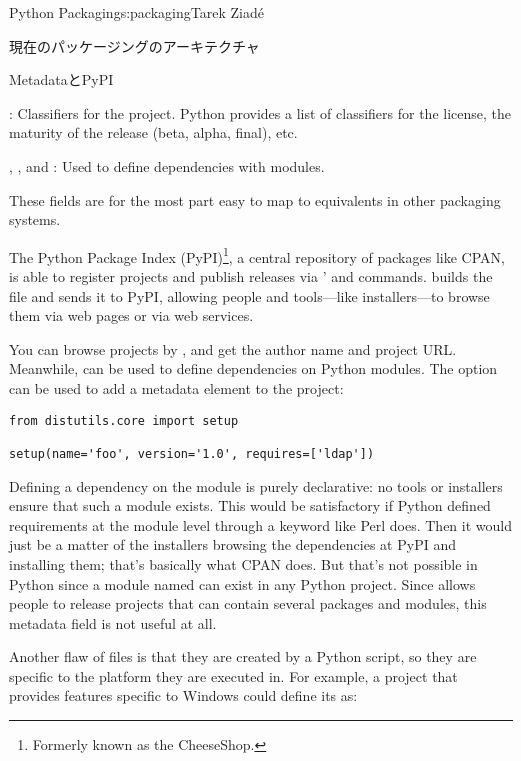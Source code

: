 \begin{aosachapter}{Python Packaging}{s:packaging}{Tarek Ziad\'{e}}
\begin{aosasect1}{現在のパッケージングのアーキテクチャ}
\begin{aosasect2}{MetadataとPyPI}
\begin{aosaitemize}
  \item {}: Classifiers for the project. Python provides a list
  of classifiers for the license, the maturity of the release (beta,
  alpha, final), etc.

  \item {}, , and :
  Used to define dependencies with modules.

\end{aosaitemize}

\noindent
These fields are for the most part easy to map to equivalents in other
packaging systems.

The Python Package Index (PyPI)\footnote{Formerly known as the
CheeseShop.}, a central repository of packages like CPAN, is able to
register projects and publish releases via '
 and  commands.   builds
the  file and sends it to PyPI, allowing people and
tools---like installers---to browse them via web pages or via web
services.


You can browse projects by , and get the author name
and project URL\@.  Meanwhile,  can be used to define
dependencies on Python modules.  The  option can be
used to add a  metadata element to the project:

\begin{verbatim}
from distutils.core import setup

setup(name='foo', version='1.0', requires=['ldap'])
\end{verbatim}

Defining a dependency on the  module is purely declarative:
no tools or installers ensure that such a module exists.  This would be
satisfactory if Python defined requirements at the module level
through a  keyword like Perl does.  Then it would
just be a matter of the installers browsing the dependencies at PyPI
and installing them; that's basically what CPAN does.  But that's not
possible in Python since a module named  can exist in any
Python project. Since  allows people to release
projects that can contain several packages and modules, this metadata
field is not useful at all.

Another flaw of  files is that they are created by a
Python script, so they are specific to the platform they are executed
in.  For example, a project that provides features specific to Windows
could define its  as:


\end{aosasect2}
\end{aosasect1}
\end{aosachapter}
